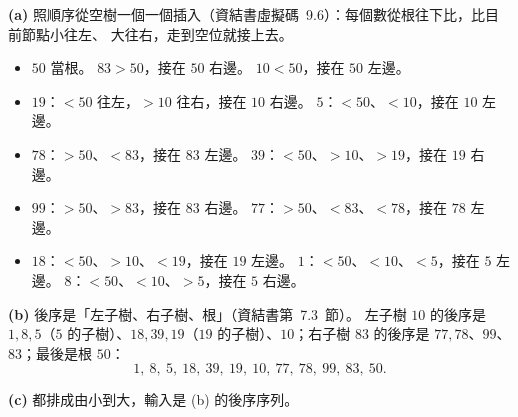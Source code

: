 \begin{pastsoln}
\textbf{(a)} 照順序從空樹一個一個插入（資結書虛擬碼~9.6）：每個數從根往下比，比目前節點小往左、
大往右，走到空位就接上去。
\begin{itemize}
\item $50$ 當根。 $83 > 50$，接在 $50$ 右邊。 $10 < 50$，接在 $50$ 左邊。
\item $19$：$< 50$ 往左，$> 10$ 往右，接在 $10$ 右邊。 $5$：$< 50$、$< 10$，接在 $10$ 左邊。
\item $78$：$> 50$、$< 83$，接在 $83$ 左邊。 $39$：$< 50$、$> 10$、$> 19$，接在 $19$ 右邊。
\item $99$：$> 50$、$> 83$，接在 $83$ 右邊。 $77$：$> 50$、$< 83$、$< 78$，接在 $78$ 左邊。
\item $18$：$< 50$、$> 10$、$< 19$，接在 $19$ 左邊。 $1$：$< 50$、$< 10$、$< 5$，接在 $5$ 左邊。
$8$：$< 50$、$< 10$、$> 5$，接在 $5$ 右邊。
\end{itemize}
\begin{center}
\end{center}

\textbf{(b)} 後序是「左子樹、右子樹、根」（資結書第~7.3~節）。 左子樹 $10$ 的後序是
$1, 8, 5$（$5$ 的子樹）、$18, 39, 19$（$19$ 的子樹）、$10$；右子樹 $83$ 的後序是
$77, 78$、$99$、$83$；最後是根 $50$：
\[
1,\ 8,\ 5,\ 18,\ 39,\ 19,\ 10,\ 77,\ 78,\ 99,\ 83,\ 50.
\]

\textbf{(c)} 都排成由小到大，輸入是 (b) 的後序序列。


\end{pastsoln}

